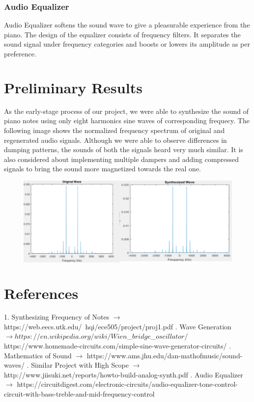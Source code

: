 \documentclass[10pt]{article}
\begin{document}
\subsubsection*{Audio Equalizer}
\vspace{-1.5ex}
Audio Equalizer softens the sound wave to give a pleasurable experience from the piano. The design of the equalizer consists of frequency filters.  It separates the sound signal under frequency categories and boosts or lowers its amplitude as per preference.
\vspace{-1.5ex}
\section*{Preliminary Results}
\vspace{-1.5ex}
As the early-stage process of our project, we were able to synthesize the sound of piano notes using only eight harmonics sine waves of corresponding frequecy. The following image shows the normalized frequency spectrum of original and regenerated audio signals. Although we were able to observe differences in damping patterns, the sounds of both the signals heard very much similar. It is also considered about implementing multiple dampers and adding compressed signals to bring the sound more magnetized towards the real one.
\begin{figure}[h]
    \centering
    \includegraphics[scale=0.4]{spectrum.png}
\end{figure}
\vspace{-1.5ex}
\section*{References}
1. Synthesizing Frequency of Notes $\to$ https://web.eecs.utk.edu/~hqi/ece505/project/proj1.pdf
. Wave Generation $\to https://en.wikipedia.org/wiki/Wien$\_$bridge$\_$oscillator/$
\newline
https://www.homemade-circuits.com/simple-sine-wave-generator-circuits/
. Mathematics of Sound $\to$ https://www.ams.jhu.edu/dan-mathofmusic/sound-waves/
. Similar Project with High Scope $\to$ http://www.jiisuki.net/reports/howto-build-analog-synth.pdf
. Audio Equalizer $\to$ https://circuitdigest.com/electronic-circuits/audio-equalizer-tone-control-circuit-with-bass-treble-and-mid-frequency-control
\end{document}
